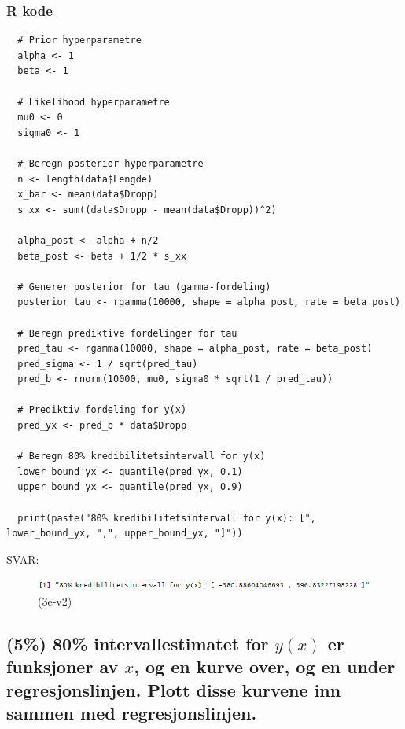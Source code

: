 \documentclass[12pt]{article}
\begin{document}
\subsubsection{R kode}
\begin{verbatim}
  # Prior hyperparametre
  alpha <- 1
  beta <- 1
  
  # Likelihood hyperparametre
  mu0 <- 0
  sigma0 <- 1
  
  # Beregn posterior hyperparametre
  n <- length(data$Lengde)
  x_bar <- mean(data$Dropp)
  s_xx <- sum((data$Dropp - mean(data$Dropp))^2)
  
  alpha_post <- alpha + n/2
  beta_post <- beta + 1/2 * s_xx
  
  # Generer posterior for tau (gamma-fordeling)
  posterior_tau <- rgamma(10000, shape = alpha_post, rate = beta_post)
  
  # Beregn prediktive fordelinger for tau
  pred_tau <- rgamma(10000, shape = alpha_post, rate = beta_post)
  pred_sigma <- 1 / sqrt(pred_tau)
  pred_b <- rnorm(10000, mu0, sigma0 * sqrt(1 / pred_tau))
  
  # Prediktiv fordeling for y(x)
  pred_yx <- pred_b * data$Dropp
  
  # Beregn 80% kredibilitetsintervall for y(x)
  lower_bound_yx <- quantile(pred_yx, 0.1)
  upper_bound_yx <- quantile(pred_yx, 0.9)
  
  print(paste("80% kredibilitetsintervall for y(x): [", lower_bound_yx, ",", upper_bound_yx, "]"))
\end{verbatim}
SVAR:
\begin{figure}[H]
  \centering
  \includegraphics[width=1\textwidth]{3e-v2.png}
  \caption{(3e-v2)}
\end{figure}



\subsection{(5\%) 80\% intervallestimatet for $y(x)$ er funksjoner av $x$, og en kurve over, og en under regresjonslinjen. Plott disse kurvene inn sammen med regresjonslinjen.}
\end{document}
